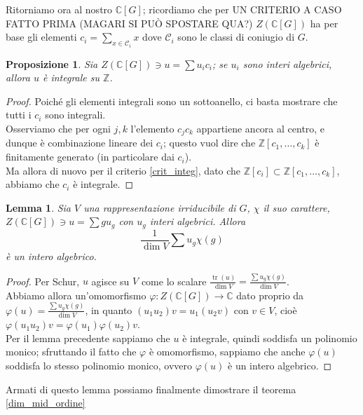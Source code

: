 \documentclass[11pt]{article}
\theoremstyle{plain}
\newtheorem{lemma}[thm]{Lemma}
\newtheorem{prop}[thm]{Proposizione}
\theoremstyle{definition}
\theoremstyle{remark}
\newcommand{\C}{\mathbb{C}}
\newcommand{\Z}{\mathbb{Z}}
\DeclareMathOperator{\tr}{tr}
\begin{document}
  Ritorniamo ora al nostro $\C[G]$; ricordiamo che per UN CRITERIO A CASO FATTO PRIMA (MAGARI SI PUÒ SPOSTARE QUA?) $Z(\C[G])$ ha per base gli elementi $c_i=\sum_{x\in\mathcal C_i}x$ dove $\mathcal C_i$ sono le classi di coniugio di $G$.\\
  \begin{prop}
   Sia $Z(\C[G])\ni u=\sum u_ic_i$; se $u_i$ sono interi algebrici, allora $u$ è integrale su $\Z$.
  \end{prop}
  \begin{proof}
   Poiché gli elementi integrali sono un sottoanello, ci basta mostrare che tutti i $c_i$ sono integrali.\\
   Osserviamo che per ogni $j,k$ l'elemento $c_jc_k$ appartiene ancora al centro, e dunque è combinazione lineare dei $c_i$; questo vuol dire che $\Z[c_1,\dots,c_k]$ è finitamente generato (in particolare dai $c_i$).\\
   Ma allora di nuovo per il criterio \ref{crit_integ}, dato che $\Z[c_i]\subset\Z[c_1,\dots,c_k]$, abbiamo che $c_i$ è integrale.
  \end{proof}
  \begin{lemma}\label{u_int_alg}
   Sia $V$ una rappresentazione irriducibile di $G$, $\chi$ il suo carattere, $Z(\C[G])\ni u=\sum gu_g$ con $u_g$ interi algebrici. Allora $$\frac1{\dim V}\sum u_g\chi(g)$$ è un intero algebrico.
  \end{lemma}
  \begin{proof}
   Per Schur, $u$ agisce su $V$ come lo scalare $\displaystyle\frac{\tr(u)}{\dim V}=\frac{\sum u_g\chi(g)}{\dim V}$.\\
   Abbiamo allora un'omomorfismo $\varphi:Z(\C[G])\to\C$ dato proprio da $\displaystyle\varphi(u)=\frac{\sum u_g\chi(g)}{\dim V}$, in quanto $(u_1u_2)v=u_1(u_2v)$ con $v\in V$, cioè $\varphi(u_1u_2)v=\varphi(u_1)\varphi(u_2)v$.\\
   Per il lemma precedente sappiamo che $u$ è integrale, quindi soddisfa un polinomio monico; sfruttando il fatto che $\varphi$ è omomorfismo, sappiamo che anche $\varphi(u)$ soddisfa lo stesso polinomio monico, ovvero $\varphi(u)$ è un intero algebrico.
  \end{proof}
  Armati di questo lemma possiamo finalmente dimostrare il teorema \ref{dim_mid_ordine}
\end{document}
